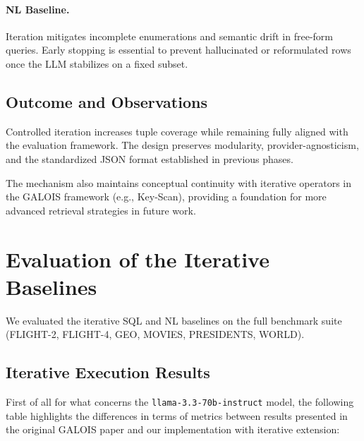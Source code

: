 \paragraph{NL Baseline.}  
Iteration mitigates incomplete enumerations and semantic drift in free-form queries.
Early stopping is essential to prevent hallucinated or reformulated rows once the LLM
stabilizes on a fixed subset.

\subsection{Outcome and Observations}

Controlled iteration increases tuple coverage while remaining fully aligned with the
evaluation framework. The design preserves modularity, provider-agnosticism, and the
standardized JSON format established in previous phases.

The mechanism also maintains conceptual continuity with iterative operators in the
GALOIS framework (e.g., Key-Scan), providing a foundation for more advanced
retrieval strategies in future work.

\section{Evaluation of the Iterative Baselines}
We evaluated the iterative SQL and NL baselines on the full benchmark suite
(FLIGHT-2, FLIGHT-4, GEO, MOVIES, PRESIDENTS, WORLD).

\subsection{Iterative Execution Results}
First of all for what concerns the \texttt{llama-3.3-70b-instruct} model, the following table highlights the differences in terms of metrics between results presented in the original GALOIS paper and our implementation with iterative extension:

